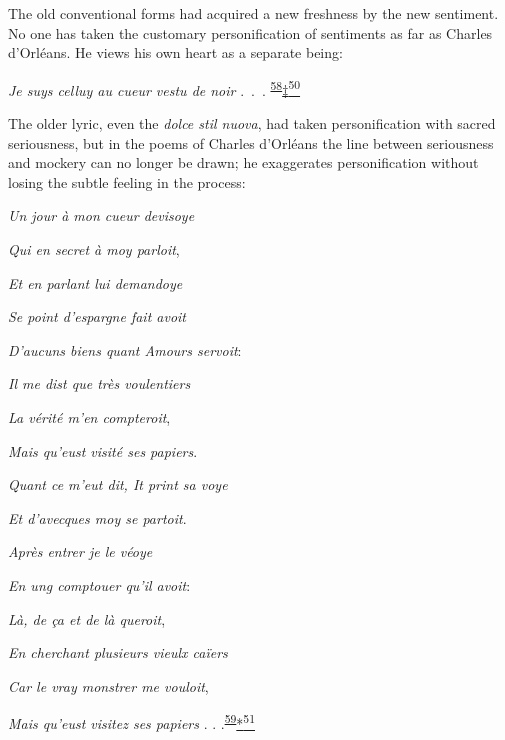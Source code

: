 The old conventional forms had acquired a new freshness by the new
sentiment. No one has taken the customary personification of sentiments
as far as Charles d'Orléans. He views his own heart as a separate being:

\emph{Je suys celluy au cueur vestu de noir} .~.~.
\textsuperscript{\protect\hypertarget{21_Chapter_Thirteen__IMAGE_AND_WORD.xhtmlux5cux23id_196}{\protect\hyperlink{23_NOTES.xhtmlux5cux23id_197}{58}}}\protect\hypertarget{21_Chapter_Thirteen__IMAGE_AND_WORD.xhtmlux5cux23id_2853}{\protect\hyperlink{23_NOTES.xhtmlux5cux23id_2854}{‡\textsuperscript{50}}}

The older lyric, even the \emph{dolce stil nuova}, had taken
personification with sacred seriousness, but in the poems of Charles
d'Orléans the line between seriousness and mockery can no longer be
drawn; he exaggerates personification without losing the subtle feeling
in the process:

\emph{Un jour à mon cueur devisoye}

\emph{Qui en secret à moy parloit},

\emph{\protect\hypertarget{21_Chapter_Thirteen__IMAGE_AND_WORD.xhtmlux5cux23page_369}{}{}Et
en parlant lui demandoye}

\emph{Se point d'espargne fait avoit}

\emph{D'aucuns biens quant Amours servoit}:

\emph{Il me dist que très voulentiers}

\emph{La vérité m'en compteroit},

\emph{Mais qu'eust visité ses papiers}.

\emph{Quant ce m'eut dit, It print sa voye}

\emph{Et d'avecques moy se partoit}.

\emph{Après entrer je le véoye}

\emph{En ung comptouer qu'il avoit}:

\emph{Là, de ça et de là queroit},

\emph{En cherchant plusieurs vieulx caïers}

\emph{Car le vray monstrer me vouloit},

\emph{Mais qu'eust visitez ses papiers} . .
.\textsuperscript{\protect\hypertarget{21_Chapter_Thirteen__IMAGE_AND_WORD.xhtmlux5cux23id_194}{\protect\hyperlink{23_NOTES.xhtmlux5cux23id_195}{59}}}\protect\hypertarget{21_Chapter_Thirteen__IMAGE_AND_WORD.xhtmlux5cux23id_2851}{\protect\hyperlink{23_NOTES.xhtmlux5cux23id_2852}{*\textsuperscript{51}}}

